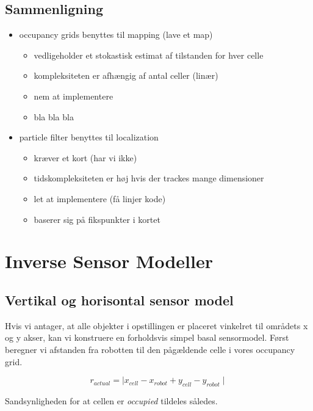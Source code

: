 \subsection{Sammenligning}
\begin{itemize}

\item occupancy grids benyttes til mapping (lave et map)
	\begin{itemize}
	\item vedligeholder et stokastisk estimat af tilstanden for hver celle
	\item kompleksiteten er afhængig af antal celler (linær)
	\item nem at implementere
	\item bla bla bla
	\end{itemize}
	
\item particle filter benyttes til localization
	\begin{itemize}
	\item kræver et kort (har vi ikke)
	\item tidskompleksiteten er høj hvis der trackes mange dimensioner
	\item let at implementere (få linjer kode)
	\item baserer sig på fikspunkter i kortet
	\end{itemize}

\end{itemize}



\section{Inverse Sensor Modeller}


\subsection{Vertikal og horisontal sensor model}
Hvis vi antager, at alle objekter i opstillingen er placeret vinkelret til områdets x og y akser,
kan vi konstruere en forholdsvis simpel basal sensormodel.
Først beregner vi afstanden fra robotten til den pågældende celle i vores occupancy grid.

$$r_{actual} = \mid x_{cell} - x_{robot} + y_{cell} - y_{robot} \mid$$

Sandsynligheden for at cellen er  \emph{occupied} tildeles således.


